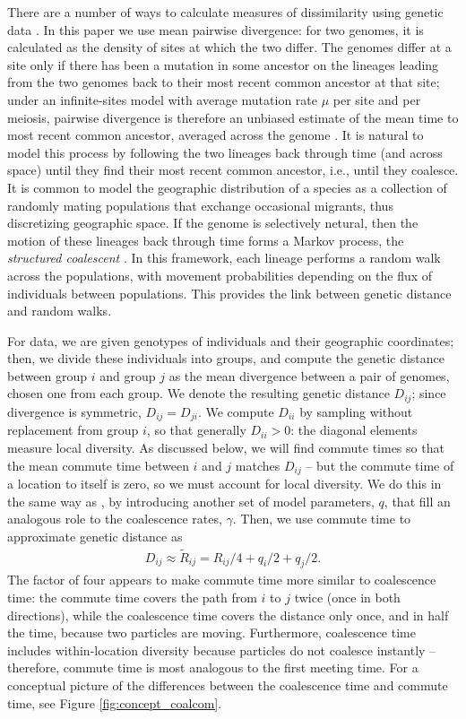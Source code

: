 \documentclass{article}
\newcommand{\comdist}{\widetilde{R}}
\begin{document}
There are a number of ways to calculate measures of dissimilarity using genetic data \citep{distances}.
In this paper we use mean pairwise divergence:
for two genomes, it is calculated as the density of sites at which the two differ.
The genomes differ at a site only if there has been a mutation in some ancestor on the lineages leading
from the two genomes back to their most recent common ancestor at that site;
under an infinite-sites model with average mutation rate $\mu$ per site and per meiosis,
pairwise divergence is therefore an unbiased estimate of the mean time to most recent common ancestor,
averaged across the genome \citep{hudson2007variance,ralphXX}.
It is natural to model this process by following the two lineages back through time
(and across space)
until they find their most recent common ancestor,
i.e., until they coalesce.
It is common to model the geographic distribution of a species
as a collection of randomly mating populations
that exchange occasional migrants,
thus discretizing geographic space.
If the genome is selectively netural,
then the motion of these lineages back through time
forms a Markov process, the \emph{structured coalescent} \citep{wakeley2005coalescent}.
In this framework, each lineage performs a random walk across the populations,
with movement probabilities depending on the flux of individuals between populations.
This provides the link between genetic distance and random walks.

For data, we are given genotypes of individuals and their geographic coordinates;
then, we divide these individuals into groups,
and compute the genetic distance between group $i$ and group $j$
as the mean divergence between a pair of genomes, chosen one from each group.
We denote the resulting genetic distance $D_{ij}$;
since divergence is symmetric, $D_{ij} = D_{ji}$.
We compute $D_{ii}$ by sampling without replacement from group $i$,
so that generally $D_{ii} > 0$: the diagonal elements measure local diversity.
As discussed below, we will find commute times so that the mean commute time between
$i$ and $j$ matches $D_{ij}$ -- but the commute time of a location to itself is zero,
so we must account for local diversity.
We do this in the same way as \citet{petkova2016visualizing},
by introducing another set of model parameters, $q$, 
that fill an analogous role to the coalescence rates, $\gamma$.
Then, we use commute time to approximate genetic distance as
\begin{align} \label{eq:commute_approx}
	D_{ij} \approx \comdist_{ij} = R_{ij}/4 + q_{i}/2 + q_{j}/2 .
\end{align}
The factor of four appears to make commute time more similar to coalescence time:
the commute time covers the path from $i$ to $j$ twice
(once in both directions),
while the coalescence time covers the distance only once,
and in half the time, because two particles are moving.
Furthermore, coalescence time includes within-location diversity
because particles do not coalesce instantly --
therefore, commute time is most analogous to the first meeting time.
For a conceptual picture of the differences between the coalescence time and commute time,
see Figure \ref{fig:concept_coalcom}. 
\end{document}
